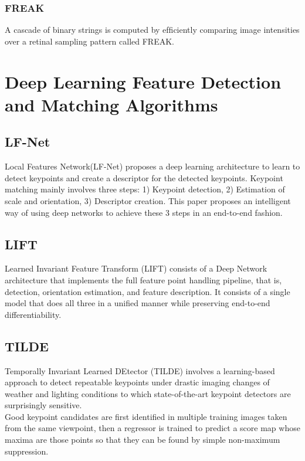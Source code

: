 \documentclass{article}[11pt]
\begin{document}
\subsubsection{FREAK}


A cascade of binary strings is computed by efﬁciently comparing image intensities over a retinal sampling pattern called FREAK.   



\section{Deep Learning Feature Detection and Matching Algorithms}
\subsection{LF-Net}

Local Features Network(LF-Net) proposes a deep learning architecture to learn to detect keypoints and create a descriptor for the detected keypoints. Keypoint matching mainly involves three steps: 1) Keypoint detection, 2) Estimation of scale and orientation, 3) Descriptor creation. This paper proposes an intelligent way of using deep networks to achieve these 3 steps in an end-to-end fashion.

\subsection{LIFT}
Learned Invariant Feature Transform (LIFT) consists of a Deep Network architecture that implements the full feature point handling pipeline, that is, detection, orientation estimation, and feature description. It consists of a single model that does all three in a unified manner while preserving end-to-end differentiability. 


\subsection{TILDE}
Temporally Invariant Learned DEtector (TILDE) involves a learning-based approach to detect repeatable keypoints under drastic imaging changes of
weather and lighting conditions to which state-of-the-art
keypoint detectors are surprisingly sensitive.
\\ Good keypoint candidates are first identified in multiple training images
taken from the same viewpoint, then a regressor is trained to
predict a score map whose maxima are those points so that they can be found by simple non-maximum suppression.
\end{document}
